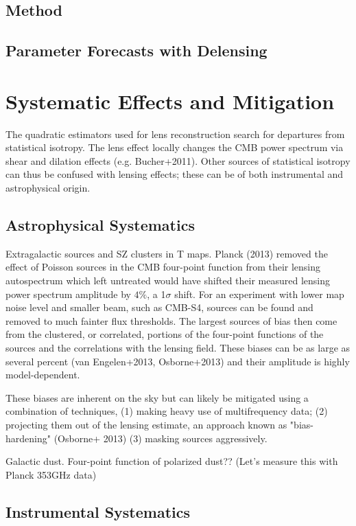 \subsection{Method}


\subsection{Parameter Forecasts with Delensing}\label{delensForecast}


\section{Systematic Effects and Mitigation}\label{syst}
The quadratic estimators used for lens reconstruction search for departures from statistical isotropy.  The lens effect locally changes the CMB power spectrum via shear and dilation effects (e.g. Bucher+2011).  Other sources of statistical isotropy can thus be confused with lensing effects; these can be of both instrumental and astrophysical origin.

\subsection{Astrophysical Systematics}
Extragalactic sources and SZ clusters in T maps.  Planck (2013) removed the effect of Poisson sources in the CMB four-point function from their lensing autospectrum which left untreated would have shifted their measured lensing power spectrum amplitude by $4\%$, a  1$\sigma$ shift.  For an experiment with lower map noise level and smaller beam, such as CMB-S4, sources can be found and removed to much fainter flux thresholds.  The largest sources of bias then come from the clustered, or correlated, portions of the four-point functions of the sources and the correlations with the lensing field.  These biases can be as large as several percent (van Engelen+2013, Osborne+2013) and their amplitude is highly model-dependent. 

These biases are inherent on the sky but can likely be mitigated using a combination of techniques, (1) making heavy use of multifrequency data; (2) projecting them out of the lensing estimate, an approach known as "bias-hardening" (Osborne+ 2013) (3) masking sources aggressively.

Galactic dust.  Four-point function of polarized dust??  (Let's measure this with Planck 353GHz data)

\subsection{Instrumental Systematics}
 	


